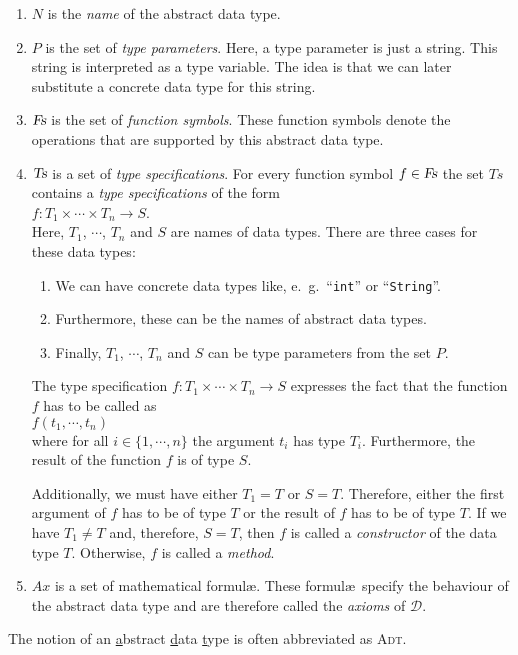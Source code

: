 \begin{enumerate}
\item $N$ is the \emph{name} of the abstract data type.
\item $P$ is the set of \emph{type parameters}.   Here, a type parameter is just a string.
      This string is interpreted as a type variable.  The idea is that we can later substitute 
      a concrete data type for this string.
\item $\textsl{Fs}$ is the set of \emph{function symbols}.  These function symbols denote the 
      operations that are supported by this abstract data type.
\item $\textsl{Ts}$ is a set of \emph{type specifications}.  For every function symbol
      $f \in \textsl{Fs}$
      the set $Ts$ contains a \emph{type specifications} of the form 
      \\[0.2cm]
      \hspace*{1.3cm} 
      $f: T_1 \times \cdots \times T_n \rightarrow S$. 
      \\[0.2cm]
      Here,  $T_1$, $\cdots$, $T_n$ and $S$ are names of data types.  There are three cases for
      these data types: 
      \begin{enumerate}
      \item We can have concrete data types like, e.~g.~``\texttt{int}'' or ``\texttt{String}''.
      \item Furthermore, these can be the names of abstract data types.
      \item Finally,  $T_1$, $\cdots$, $T_n$ and $S$ can be type parameters from the set $P$.
      \end{enumerate}
      The type specification $f: T_1 \times \cdots \times T_n \rightarrow S$ expresses the fact that
      the function $f$ has to be called as \\[0.2cm] 
      \hspace*{1.3cm}
      $f(t_1,\cdots,t_n)$ 
      \\[0.2cm]
      where for all $i \in \{1,\cdots,n\}$ the argument $t_i$ has type 
      $T_i$.  Furthermore, the result of the function $f$ is of type $S$.

      Additionally, we must have either $T_1 = T$ or $S = T$.  Therefore, either
      the first argument of $f$ has to be of type $T$ or the result of $f$ has to be of type 
      $T$.  If we have  $T_1 \not= T$ and, therefore, $S = T$,
      then $f$ is called a \emph{constructor} of the data type $T$.  Otherwise,
      $f$ is called a  \emph{method}.
\item $Ax$ is a set of mathematical formul\ae.   These formul\ae\ 
      specify the behaviour of the abstract data type and are therefore called
      the \emph{axioms} of $\mathcal{D}$.
\end{enumerate}
The notion of an \underline{a}bstract \underline{d}ata \underline{t}ype is often abbreviated as \textsc{Adt}.

